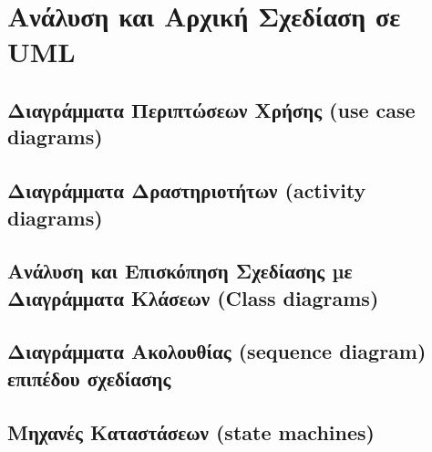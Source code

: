 \chapter{Ανάλυση και Αρχική Σχεδίαση σε UML}
	
\section{Διαγράμματα Περιπτώσεων Χρήσης (use case diagrams)}
\section{Διαγράμματα Δραστηριοτήτων (activity diagrams)}
\section{Ανάλυση και Επισκόπηση Σχεδίασης µε Διαγράμματα Κλάσεων (Class diagrams)}
\section{Διαγράμματα Ακολουθίας (sequence diagram) επιπέδου σχεδίασης}
\section{Μηχανές Καταστάσεων (state machines)}

